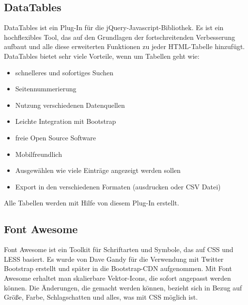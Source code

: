 \subsection{DataTables}

DataTables ist ein Plug-In f\"{u}r die jQuery-Javascript-Bibliothek. Es ist ein hochflexibles Tool, das auf den Grundlagen der fortschreitenden Verbesserung aufbaut und alle diese erweiterten Funktionen zu jeder HTML-Tabelle hinzuf\"{u}gt. DataTables bietet sehr viele Vorteile, wenn um Tabellen geht wie: 
\begin{itemize}
	\item schnelleres und sofortiges Suchen
	\item Seitennummerierung
	\item Nutzung verschiedenen Datenquellen
	\item Leichte Integration mit Bootstrap
	\item freie Open Source Software 
	\item Mobilfreundlich
	\item Ausgewählen wie viele Einträge angezeigt werden sollen 
	\item Export in den verschiedenen Formaten (ausdrucken oder CSV Datei)
\end{itemize}

Alle Tabellen werden mit Hilfe von diesem Plug-In erstellt. \cite{40_datatables}



\subsection{Font Awesome}
Font Awesome ist ein Toolkit für Schriftarten und Symbole, das auf CSS und LESS basiert. Es wurde von Dave Gandy für die Verwendung mit Twitter Bootstrap erstellt und später in die Bootstrap-CDN aufgenommen. Mit Font Awesome erhaltet man skalierbare Vektor-Icons, die sofort angepasst werden können. Die Änderungen, die gemacht werden können, bezieht sich in Bezug auf Größe, Farbe, Schlagschatten und alles, was mit CSS möglich ist. \cite{40_fontawesome}




